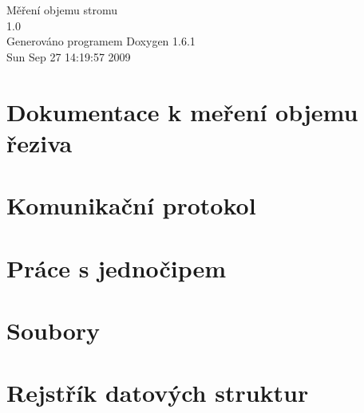 \documentclass[a4paper]{book}
\begin{document}
\begin{titlepage}
\vspace*{7cm}
\begin{center}
{\Large Měření objemu stromu \\[1ex]\large 1.0 }\\
\vspace*{1cm}
{\large Generováno programem Doxygen 1.6.1}\\
\vspace*{0.5cm}
{\small Sun Sep 27 14:19:57 2009}\\
\end{center}
\end{titlepage}
\clearemptydoublepage
{}
\tableofcontents
\clearemptydoublepage
{}
\chapter{Dokumentace k meření objemu řeziva}
\label{index}
\chapter{Komunikační protokol}
\label{comunication_protocol}

\chapter{Práce s jednočipem}
\label{glob_prace_s_jednocipem}

\chapter{Soubory}
\label{struktura}

\chapter{Rejstřík datových struktur}

\printindex
\end{document}
